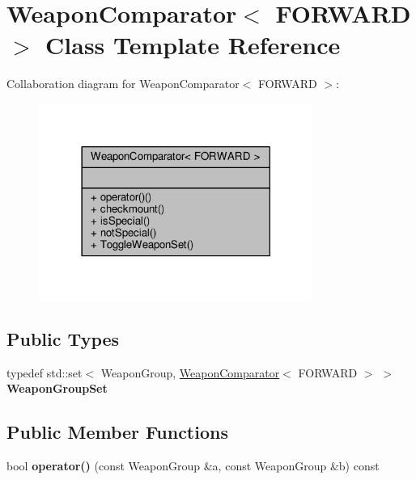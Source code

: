\hypertarget{classWeaponComparator}{}\section{Weapon\+Comparator$<$ F\+O\+R\+W\+A\+RD $>$ Class Template Reference}
\label{classWeaponComparator}


Collaboration diagram for Weapon\+Comparator$<$ F\+O\+R\+W\+A\+RD $>$\+:
\nopagebreak
\begin{figure}[H]
\begin{center}
\leavevmode
\includegraphics[width=254pt]{dd/d92/classWeaponComparator__coll__graph}
\end{center}
\end{figure}
\subsection*{Public Types}
\begin{DoxyCompactItemize}
\item 
typedef std\+::set$<$ Weapon\+Group, \hyperlink{classWeaponComparator}{Weapon\+Comparator}$<$ F\+O\+R\+W\+A\+RD $>$ $>$ {\bfseries Weapon\+Group\+Set}\hypertarget{classWeaponComparator_a8eaf8ffd9ec21fc6a909eea0e4b6373f}{}\label{classWeaponComparator_a8eaf8ffd9ec21fc6a909eea0e4b6373f}

\end{DoxyCompactItemize}
\subsection*{Public Member Functions}
\begin{DoxyCompactItemize}
\item 
bool {\bfseries operator()} (const Weapon\+Group \&a, const Weapon\+Group \&b) const \hypertarget{classWeaponComparator_a71d21d97ac8324be1520be66fdbf100b}{}\label{classWeaponComparator_a71d21d97ac8324be1520be66fdbf100b}

\end{DoxyCompactItemize}
